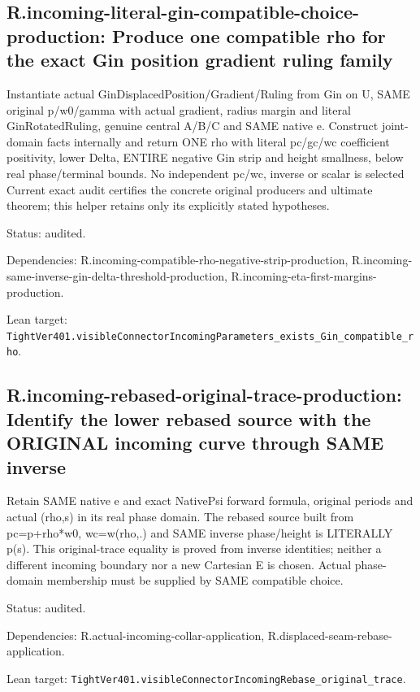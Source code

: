 \documentclass{article}
\begin{document}
\subsection*{R.incoming-literal-gin-compatible-choice-production: Produce one compatible rho for the exact Gin position gradient ruling family}
Instantiate actual GinDisplacedPosition/Gradient/Ruling from Gin on U, SAME original p/w0/gamma with actual gradient, radius margin and literal GinRotatedRuling, genuine central A/B/C and SAME native e. Construct joint-domain facts internally and return ONE rho with literal pc/gc/wc coefficient positivity, lower Delta, ENTIRE negative Gin strip and height smallness, below real phase/terminal bounds. No independent pc/wc, inverse or scalar is selected Current exact audit certifies the concrete original producers and ultimate theorem; this helper retains only its explicitly stated hypotheses.
\par Status: audited.
\par Dependencies: R.incoming-compatible-rho-negative-strip-production, R.incoming-same-inverse-gin-delta-threshold-production, R.incoming-eta-first-margins-production.
\par Lean target: \texttt{TightVer401.visibleConnectorIncomingParameters\_exists\_Gin\_compatible\_rho}.
\subsection*{R.incoming-rebased-original-trace-production: Identify the lower rebased source with the ORIGINAL incoming curve through SAME inverse}
Retain SAME native e and exact NativePsi forward formula, original periods and actual (rho,s) in its real phase domain. The rebased source built from pc=p+rho*w0, wc=w(rho,.) and SAME inverse phase/height is LITERALLY p(s). This original-trace equality is proved from inverse identities; neither a different incoming boundary nor a new Cartesian E is chosen. Actual phase-domain membership must be supplied by SAME compatible choice.
\par Status: audited.
\par Dependencies: R.actual-incoming-collar-application, R.displaced-seam-rebase-application.
\par Lean target: \texttt{TightVer401.visibleConnectorIncomingRebase\_original\_trace}.
\end{document}
